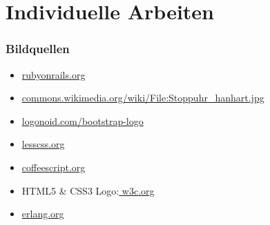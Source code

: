 \documentclass{beamer}
\begin{document}
\section{Individuelle Arbeiten}






\begin{frame}
\frametitle{Bildquellen}
\begin{itemize}
	\item \url{rubyonrails.org}
	\item \url{commons.wikimedia.org/wiki/File:Stoppuhr_hanhart.jpg}
	\item \url{logonoid.com/bootstrap-logo}
	\item \url{lesscss.org}
	\item \url{coffeescript.org}
	\item HTML5 \& CSS3 Logo:\url{ w3c.org}
	\item \url{erlang.org}
\end{itemize}
\end{frame}
\end{document}
